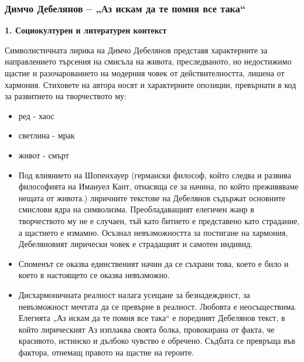 \documentclass[12pt,a4paper]{article}
\begin{document}
\subsubsection{\colorbox{green!40}{Димчо Дебелянов – „Аз искам да те помня все така“}}

\textbf{1. Социокултурен и литературен контекст}
\vspace{0.1cm}
 
\indent Символистичната лирика на Димчо Дебелянов представя характерните за направлението търсения на смисъла на живота, преследваното, но недостижимо щастие и разочарованието на модерния човек от действителността, лишена от хармония. Стиховете на автора носят и характерните опозиции, превърнати в код за развитието на творчеството му:
\begin{itemize}
    \vspace{-0.2cm}
    \item ред - хаос
    \vspace{-0.2cm}
    \item светлина - мрак
    \vspace{-0.2cm}
    \item живот - смърт
    \vspace{-0.2cm}
\end{itemize}

\begin{itemize}[leftmargin=*]
\item Под влиянието на Шопенхауер (германски философ, който следва и развива философията на Имануел Кант, отнасяща се за начина, по който преживяваме нещата от живота.) лиричните текстове на Дебелянов съдържат основните смислови ядра на символизма. Преобладаващият елегичен жанр в творчеството му не е случаен, тъй като битието е представено като страдание, а щастието е измамно. Осъзнал невъзможността за постигане на хармония, Дебеляновият лирически човек е страдащият и самотен индивид.
\vspace{-0.85cm}
\end{itemize}

\begin{itemize}[leftmargin=*]
\item Споменът се оказва единственият начин да се съхрани това, което е било и което в настоящето се оказва невъзможно.
\vspace{-0.3cm}
\end{itemize}

\begin{itemize}[leftmargin=*]
\item Дисхармоничната реалност налага усещане за безнадеждност, за невъзможност мечтата да се превърне в реалност. Любовта е неосъществима. Елегията „Аз искам да те помня все така“ е поредният Дебелянов текст, в който лирическият Аз изплаква своята болка, провокирана от факта, че красивото, истинско и дълбоко чувство е обречено. Съдбата се превръща във фактора, отнемащ правото на щастие на героите.
\vspace{-0.2cm}
\end{itemize}
\end{document}
